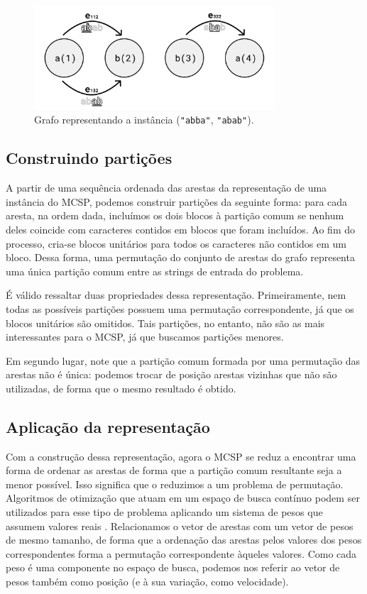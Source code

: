 \begin{figure}
    \centering
    \includegraphics[width=0.8\textwidth]{images/grafo.pdf}
    \caption{Grafo representando a instância (\texttt{"abba"}, \texttt{"abab"}).}
    \label{fig:grafo}
\end{figure}

\subsection{Construindo partições} \label{sec:construindo-particoes}

    A partir de uma sequência ordenada das arestas da representação de uma instância do MCSP, podemos construir partições da seguinte forma: para cada aresta, na ordem dada, incluímos os dois blocos à partição comum se nenhum deles coincide com caracteres contidos em blocos que foram incluídos. Ao fim do processo, cria-se blocos unitários para todos os caracteres não contidos em um bloco. Dessa forma, uma permutação do conjunto de arestas do grafo representa uma única partição comum entre as strings de entrada do problema.

    É válido ressaltar duas propriedades dessa representação. Primeiramente, nem todas as possíveis partições possuem uma permutação correspondente, já que os blocos unitários são omitidos. Tais partições, no entanto, não são as mais interessantes para o MCSP, já que buscamos partições menores.

    Em segundo lugar, note que a partição comum formada por uma permutação das arestas não é única: podemos trocar de posição arestas vizinhas que não são utilizadas, de forma que o mesmo resultado é obtido.

\subsection{Aplicação da representação}

    Com a construção dessa representação, agora o MCSP se reduz a encontrar uma forma de ordenar as arestas de forma que a partição comum resultante seja a menor possível. Isso significa que o reduzimos a um problema de permutação. Algoritmos de otimização que atuam em um espaço de busca contínuo podem ser utilizados para esse tipo de problema aplicando um sistema de pesos que assumem valores reais \cite[p.~661]{marti_handbook_2018}. Relacionamos o vetor de arestas com um vetor de pesos de mesmo tamanho, de forma que a ordenação das arestas pelos valores dos pesos correspondentes forma a permutação correspondente àqueles valores. Como cada peso é uma componente no espaço de busca, podemos nos referir ao vetor de pesos também como posição (e à sua variação, como velocidade).
